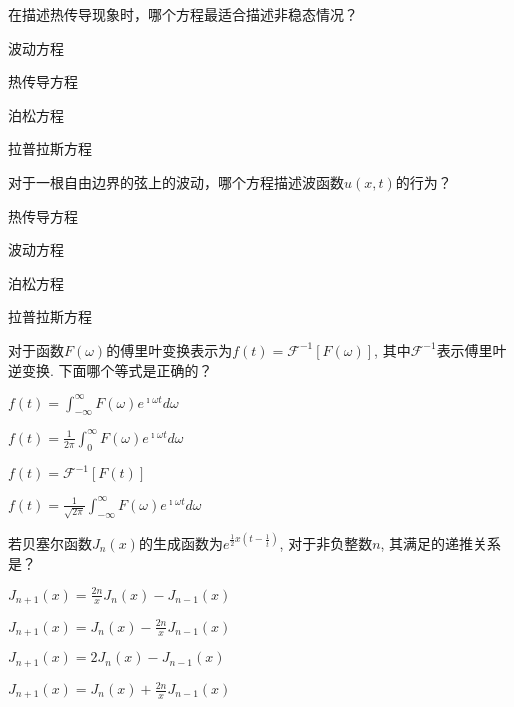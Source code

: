 \documentclass{njustexam}
\begin{document}
    \begin{problem}
    在描述热传导现象时，哪个方程最适合描述非稳态情况？
    \begin{abcd}
    \item 波动方程
    \item 热传导方程
    \item 泊松方程
    \item 拉普拉斯方程
    \end{abcd}
    \end{problem}
    
    \begin{problem}
    对于一根自由边界的弦上的波动，哪个方程描述波函数$u(x, t)$的行为？
    \begin{abcd}
    \item 热传导方程
    \item 波动方程
    \item 泊松方程
    \item 拉普拉斯方程
    \end{abcd}
    \end{problem}
    
    \begin{problem}
    对于函数$F(\omega)$的傅里叶变换表示为$f(t) = \mathcal{F}^{-1}[F(\omega)]$, 其中$\mathcal{F}^{-1}$表示傅里叶逆变换. 下面哪个等式是正确的？
    \begin{abcd}
    \item $f(t) = \int_{-\infty}^{\infty} F(\omega) e^{\imath\omega t} d\omega$
    \item $f(t) = \frac{1}{2\pi} \int_{0}^{\infty} F(\omega) e^{\imath\omega t} d\omega$
    \item $f(t) = \mathcal{F}^{-1}[F(t)]$
    \item $f(t) = \frac{1}{\sqrt{2\pi}} \int_{-\infty}^{\infty} F(\omega) e^{\imath\omega t} d\omega$
    \end{abcd}
    \end{problem}
    
    \begin{problem}
    若贝塞尔函数$J_n(x)$的生成函数为$e^{\frac{1}{2} x (t - \frac{1}{t})}$, 对于非负整数$n$, 其满足的递推关系是？
    \begin{abcd}
    \item $J_{n+1}(x) = \frac{2n}{x} J_n(x) - J_{n-1}(x)$
    \item $J_{n+1}(x) = J_n(x) - \frac{2n}{x} J_{n-1}(x)$
    \item $J_{n+1}(x) = 2 J_n(x) - J_{n-1}(x)$
    \item $J_{n+1}(x) = J_n(x) + \frac{2n}{x} J_{n-1}(x)$
    \end{abcd}
    \end{problem}
\end{document}
